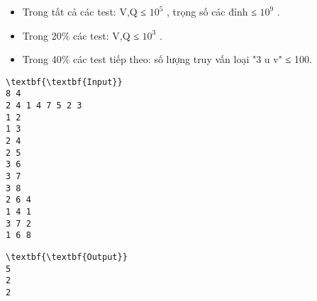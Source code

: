 \begin{itemize}
	\item Trong tất cả các test: V,Q ≤ $10^{5}$ , trọng số các đỉnh ≤ $10^{9}$ .
	\item Trong 20\% các test: V,Q ≤ $10^{3}$ .
	\item Trong 40\% các test tiếp theo: số lượng truy vấn loại "3 u v" ≤ 100.
\end{itemize}
\begin{verbatim}
\textbf{\textbf{Input}}
8 4
2 4 1 4 7 5 2 3
1 2
1 3
2 4
2 5
3 6
3 7
3 8
2 6 4
1 4 1
3 7 2
1 6 8
\end{verbatim}
\begin{verbatim}
\textbf{\textbf{Output}}
5
2
2\end{verbatim}